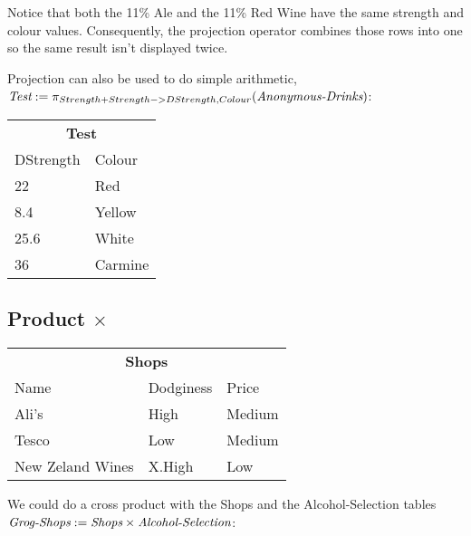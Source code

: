 Notice that both the 11\% Ale and the 11\% Red Wine have the same strength and
colour values. Consequently, the projection operator combines those rows into
one so the same result isn't displayed twice.

Projection can also be used to do simple arithmetic, $\text{\it Test} :=
\pi_{Strength + Strength->DStrength, Colour}(\text{\it Anonymous-Drinks})$:

\begin{center}
  \begin{tabular}{ll}
    \multicolumn{2}{c}{\textbf{Test}}\\
    {DStrength} & {Colour}\\ \hline
    22         & Red\\
    8.4        & Yellow\\
    25.6       & White\\
    36         & Carmine\\
  \end{tabular}
\end{center}

\subsection{Product $\times$}

\begin{center}
  \begin{tabular}{lll}
    \multicolumn{3}{c}{\textbf{Shops}}\\
    {Name}           & {Dodginess} & {Price}\\ \hline
    Ali's            & High        & Medium \\
    Tesco            & Low         & Medium \\
    New Zeland Wines & X.High      & Low    \\
  \end{tabular}
\end{center}

We could do a cross product with the Shops and the Alcohol-Selection tables
$\text{\it Grog-Shops} := \text{\it Shops} \times \text{\it Alcohol-Selection}$:

